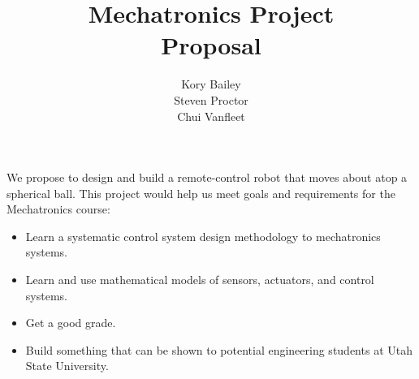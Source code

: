 \documentclass[12pt,a4paper]{article}
\author{Kory Bailey\\Steven Proctor\\Chui Vanfleet}
\title{Mechatronics Project\\Proposal}
\begin{document}
\maketitle

\begin{flushleft}

	We propose to design and build a remote-control robot that moves about atop a spherical ball. This project would help us meet goals and requirements for the Mechatronics course:
	\begin{itemize}
		\item Learn a systematic control system design methodology to mechatronics systems.
		\item Learn and use mathematical models of sensors, actuators, and control systems.
		\item Get a good grade.
		\item Build something that can be shown to potential engineering students at Utah State University.
	\end{itemize}

	
\end{flushleft}
\end{document}
